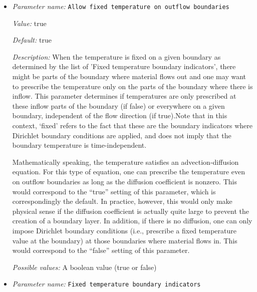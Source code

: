 \begin{itemize}
\item {\it Parameter name:} {\tt Allow fixed temperature on outflow boundaries}
\label{parameters:Boundary temperature model/Allow fixed temperature on outflow boundaries}
\label{parameters:Boundary_20temperature_20model/Allow_20fixed_20temperature_20on_20outflow_20boundaries}


{\it Value:} true


{\it Default:} true


{\it Description:} When the temperature is fixed on a given boundary as determined by the list of 'Fixed temperature boundary indicators', there might be parts of the boundary where material flows out and one may want to prescribe the temperature only on the parts of the boundary where there is inflow. This parameter determines if temperatures are only prescribed at these inflow parts of the boundary (if false) or everywhere on a given boundary, independent of the flow direction (if true).Note that in this context, `fixed' refers to the fact that these are the boundary indicators where Dirichlet boundary conditions are applied, and does not imply that the boundary temperature is time-independent. 

Mathematically speaking, the temperature satisfies an advection-diffusion equation. For this type of equation, one can prescribe the temperature even on outflow boundaries as long as the diffusion coefficient is nonzero. This would correspond to the ``true'' setting of this parameter, which is correspondingly the default. In practice, however, this would only make physical sense if the diffusion coefficient is actually quite large to prevent the creation of a boundary layer. In addition, if there is no diffusion, one can only impose Dirichlet boundary conditions (i.e., prescribe a fixed temperature value at the boundary) at those boundaries where material flows in. This would correspond to the ``false'' setting of this parameter.


{\it Possible values:} A boolean value (true or false)
\item {\it Parameter name:} {\tt Fixed temperature boundary indicators}
\label{parameters:Boundary temperature model/Fixed temperature boundary indicators}
\label{parameters:Boundary_20temperature_20model/Fixed_20temperature_20boundary_20indicators}



\end{itemize}
